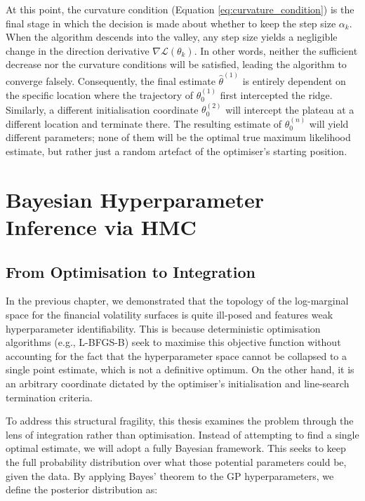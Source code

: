 \documentclass[12pt,oneside]{report}
\theoremstyle{definition}
\theoremstyle{remark}
\begin{document}
At this point, the curvature condition (Equation \ref{eq:curvature_condition}) is the final stage in which the decision is made about whether to keep the step size $\alpha_k$. When the algorithm descends into the valley, any step size yields a negligible change in the direction derivative $\nabla \mathcal{L}(\theta_k)$. In other words, neither the sufficient decrease nor the curvature conditions will be satisfied, leading the algorithm to converge falsely. Consequently, the final estimate $\hat{\theta}^{(1)}$ is entirely dependent on the specific location where the trajectory of $\theta_0^{(1)}$ first intercepted the ridge. Similarly, a different initialisation coordinate $\theta_0^{(2)}$ will intercept the plateau at a different location and terminate there. The resulting estimate of $\theta_0^{(n)}$ will yield different parameters; none of them will be the optimal true maximum likelihood estimate, but rather just a random artefact of the optimiser's starting position.

\chapter{Bayesian Hyperparameter Inference via HMC}

\section{From Optimisation to Integration}
In the previous chapter, we demonstrated that the topology of the log-marginal space for the financial volatility surfaces is quite ill-posed and features weak hyperparameter identifiability. This is because deterministic optimisation algorithms (e.g., L-BFGS-B) seek to maximise this objective function without accounting for the fact that the hyperparameter space cannot be collapsed to a single point estimate, which is not a definitive optimum. On the other hand, it is an arbitrary coordinate dictated by the optimiser's initialisation and line-search termination criteria. 

To address this structural fragility, this thesis examines the problem through the lens of integration rather than optimisation. Instead of attempting to find a single optimal estimate, we will adopt a fully Bayesian framework. This seeks to keep the full probability distribution over what those potential parameters could be, given the data. By applying Bayes' theorem to the GP hyperparameters, we define the posterior distribution as:
\end{document}
